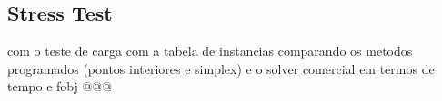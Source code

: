 \documentclass[a4paper]{IEEEtran}
\begin{document}
\subsection{Stress Test}
com o teste de carga com a tabela de instancias comparando os metodos programados (pontos interiores e simplex) e o solver comercial em termos de tempo e fobj @@@
%
%



%
%
\end{document}
